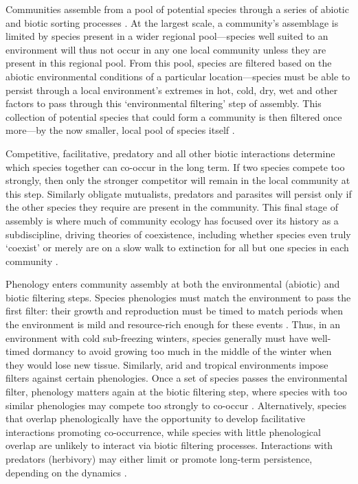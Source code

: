 \documentclass[11pt]{article}
\begin{document}
Communities assemble from a pool of potential species through a series of abiotic and biotic sorting processes \citep{hillerislambers2012rethinking}. At the largest scale, a community's assemblage is limited by species present in a wider regional pool---species well suited to an environment will thus not occur in any one local community unless they are present in this regional pool. From this pool, species are filtered based on the abiotic environmental conditions of a particular location---species must be able to persist through a local environment's extremes in hot, cold, dry, wet and other factors to pass through this `environmental filtering' step of assembly. This collection of potential species that could form a community is then filtered once more---by the now smaller, local pool of species itself \citep{hillerislambers2012rethinking}. 

Competitive, facilitative, predatory and all other biotic interactions determine which species together can co-occur in the long term. If two species compete too strongly, then only the stronger competitor will remain in the local community at this step. Similarly obligate mutualists, predators and parasites will persist only if the other species they require are present in the community. This final stage of assembly is where much of community ecology has focused over its history as a subdiscipline, driving theories of coexistence, including whether species even truly `coexist' or merely are on a slow walk to extinction for all but one species in each community \citep{Hubbell:2001vo}. 

Phenology enters community assembly at both the environmental (abiotic) and biotic filtering steps. Species phenologies must match the environment to pass the first filter: their growth and reproduction must be timed to match periods when the environment is mild and resource-rich enough for these events \citep{rathcke1985phenological}. Thus, in an environment with cold sub-freezing winters, species generally must have well-timed dormancy to avoid growing too much in the middle of the winter when they would lose new tissue. Similarly, arid and tropical environments impose filters against certain phenologies. Once a set of species passes the environmental filter, phenology matters again at the biotic filtering step, where species with too similar phenologies may compete too strongly to co-occur \citep{gause1932experimental, abrams1983theory}.   Alternatively, species that overlap phenologically have the opportunity to develop facilitative interactions \citep{duchenne2021phenological} promoting co-occurrence, while species with little phenological overlap are unlikely to interact via biotic filtering processes. Interactions with predators (herbivory) may either limit or promote long-term persistence, depending on the dynamics \citep[such dynamics relate in part to a larger literature on trophic synchrony, for which we refer readers to a number of recent reviews, e.g.][]{kharouba2018global,renner2018climate}.
\end{document}
